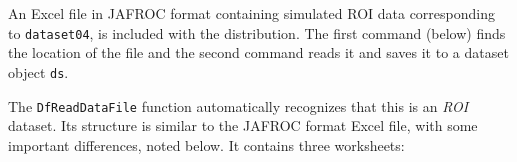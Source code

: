 \documentclass[]{book}
\newenvironment{Shaded}{\begin{snugshade}}{\end{snugshade}}
\newcommand{\CommentTok}[1]{\textcolor[rgb]{0.56,0.35,0.01}{\textit{#1}}}
\newcommand{\DataTypeTok}[1]{\textcolor[rgb]{0.13,0.29,0.53}{#1}}
\newcommand{\KeywordTok}[1]{\textcolor[rgb]{0.13,0.29,0.53}{\textbf{#1}}}
\newcommand{\NormalTok}[1]{#1}
\newcommand{\OperatorTok}[1]{\textcolor[rgb]{0.81,0.36,0.00}{\textbf{#1}}}
\newcommand{\OtherTok}[1]{\textcolor[rgb]{0.56,0.35,0.01}{#1}}
\newcommand{\StringTok}[1]{\textcolor[rgb]{0.31,0.60,0.02}{#1}}
\begin{document}
An Excel file in JAFROC format containing simulated ROI data corresponding to \texttt{dataset04}, is included with the distribution. The first command (below) finds the location of the file and the second command reads it and saves it to a dataset object \texttt{ds}.

\begin{Shaded}
\end{Shaded}

The \texttt{DfReadDataFile} function automatically recognizes that this is an \emph{ROI} dataset. Its structure is similar to the JAFROC format Excel file, with some important differences, noted below. It contains three worksheets:
\end{document}
